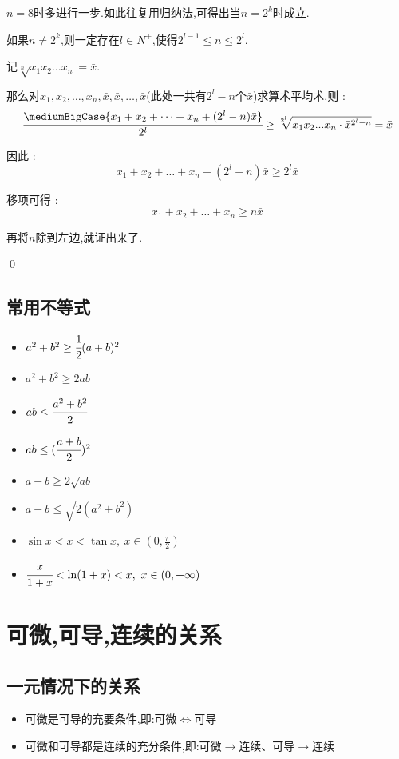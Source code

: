 {{{    $n = 8$时多进行一步.如此往复用归纳法,可得出当$n = 2^k$时成立.

    如果$n \neq 2^k$,则一定存在$l \in N^+$,使得$2^{l - 1} \leq n \leq 2^l$.

    记$\sqrt[n]{x_1x_2 \dots x_n} = \bar{x}$.

    那么对$x_1,x_2,\dots,x_n,\bar{x},\bar{x},\dots,\bar{x}$(此处一共有$2^l - n$个$\bar{x}$)求算术平均术,则 : $$
        \cfrac{\mediumBigCase{x_1+x_2+\dots+x_n+(2^l - n)\bar{x}}}{2^l} \geq \sqrt[2^l]{x_1x_2...x_n \cdot \bar{x}^{2^l - n}} = \bar{x}
    $$

    因此 : $$
        x_1 + x_2 + \dots + x_n + (2^l - n)\bar{x} \geq 2^l\bar{x}
    $$

    移项可得 : $$
        x_1 + x_2 + \dots + x_n \geq n\bar{x}
    $$

    再将$n$除到左边,就证出来了.

    \qed
}%

\subsection{常用不等式}{
    \begin{itemize}
        \item $a^2 + b^2 \geq \cfrac{1}{2}(a + b)^2$
        \item $a^2 + b^2 \geq 2ab$
        \item $ab \leq \cfrac{a^2 + b^2}{2}$
        \item $ab \leq (\cfrac{a + b}{2})^2$
        \item $a + b \geq 2\sqrt{ab}$
        \item $a + b \leq \sqrt{2(a^2 + b^2)}$
        \item $\sin x < x < \tan x,\ x \in (0,\frac{\pi}{2})$
        \item $\cfrac{x}{1 + x} < \ln(1 + x) < x,\ x \in (0, +\infty)$
    \end{itemize}
}%

}%

\section{可微,可导,连续的关系}{

  \subsection{一元情况下的关系}{
      \begin{itemize}
          \item 可微是可导的充要条件,即:可微$\Leftrightarrow$可导
          \item 可微和可导都是连续的充分条件,即:可微$\rightarrow$连续、可导$\rightarrow$连续
      \end{itemize}

}}}

